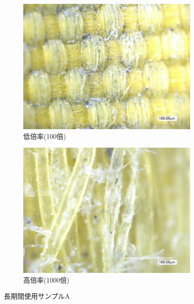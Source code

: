 \documentclass[main]{subfiles}
\begin{document}
\begin{figure}[H]
    \centering
    \begin{subfigure}[htbp]{0.45\linewidth}
        \centering
        \includegraphics[keepaspectratio, width=0.8\linewidth]{figures/縁/カーリングパッド長期低倍率.jpg}
        \caption{低倍率(100倍)}
        \label{fig:label}
    \end{subfigure}
    \begin{subfigure}[htbp]{0.45\linewidth}
        \centering
        \includegraphics[keepaspectratio, width=0.8\linewidth]{figures/縁/カーリングパッド長期.jpg}
        \caption{高倍率(1000倍)}
        \label{fig:label}
    \end{subfigure}
    \caption{長期間使用サンプルA}
    \label{fig:4}
\end{figure}
    
\end{document}
